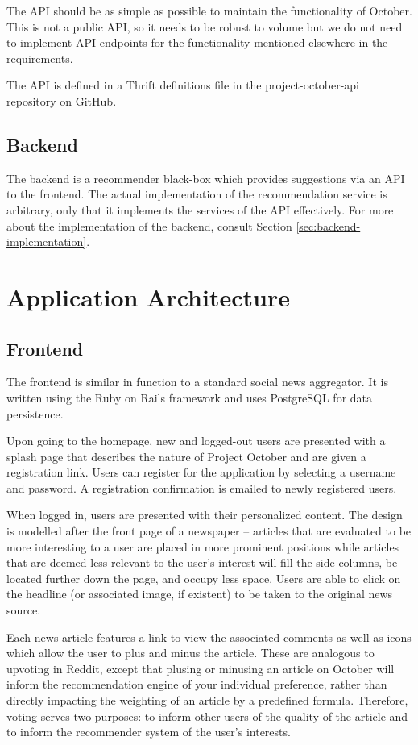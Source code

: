 \documentclass[11pt,letterpaper]{article}
\begin{document}
The API should be as simple as possible to maintain the functionality of October. This is not a public API, so it needs to be robust to volume but we do not need to implement API endpoints for the functionality mentioned elsewhere in the requirements.

The API is defined in a Thrift definitions file in the project-october-api repository on GitHub\cite{project-october-api}.

\subsection{Backend} %
The backend is a recommender black-box which provides suggestions via an API to the frontend.
The actual implementation of the recommendation service is arbitrary, only that it implements the services of the API effectively.
For more about the implementation of the backend, consult Section \ref{sec:backend-implementation}.

\section{Application Architecture}
\subsection{Frontend}
The frontend is similar in function to a standard social news aggregator.
It is written using the Ruby on Rails framework\cite{rubyonrails} and uses PostgreSQL for data persistence.

Upon going to the homepage, new and logged-out users are presented with a splash page that describes the nature of Project October and are given a registration link.
Users can register for the application by selecting a username and password.
A registration confirmation is emailed to newly registered users.

When logged in, users are presented with their personalized content.
The design is modelled after the front page of a newspaper -- articles that are evaluated to be more interesting to a user are placed in more prominent positions while articles that are deemed less relevant to the user's interest will fill the side columns, be located further down the page, and occupy less space.
Users are able to click on the headline (or associated image, if existent) to be taken to the original news source.

Each news article features a link to view the associated comments as well as icons which allow the user to plus and minus the article.
These are analogous to upvoting in Reddit, except that plusing or minusing an article on October will inform the recommendation engine of your individual preference, rather than directly impacting the weighting of an article by a predefined formula.
Therefore, voting serves two purposes: to inform other users of the quality of the article and to inform the recommender system of the user's interests.
\end{document}
